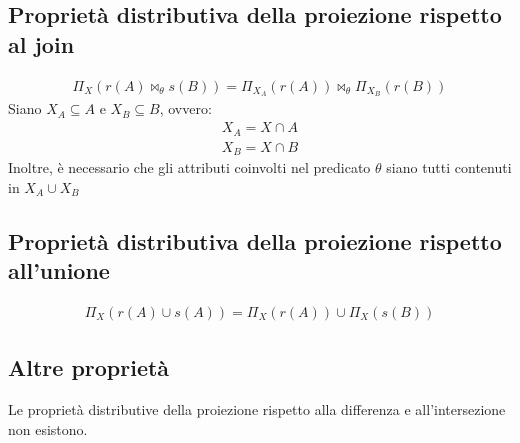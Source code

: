 \subsection{Proprietà distributiva della proiezione rispetto al join}
    \begin{equation}\begin{aligned}
        \Pi_X (r(A) \bowtie_{\theta} s(B)) = \Pi_{X_A} (r(A)) \bowtie_{\theta} \Pi_{X_B} (r(B))
    \end{aligned}\end{equation}
Siano $X_A \subseteq A$ e $X_B \subseteq B$, ovvero:
    \begin{equation}\begin{aligned}
        X_A = X \cap A\\
        X_B = X \cap B
    \end{aligned}\end{equation}
Inoltre, è necessario che gli attributi coinvolti nel predicato $\theta$ siano tutti contenuti in $X_A \cup X_B$

\subsection{Proprietà distributiva della proiezione rispetto all'unione}
    \begin{equation}\begin{aligned}
        \Pi_X (r(A) \cup s(A)) = \Pi_X (r(A)) \cup \Pi_X (s(B))
    \end{aligned}\end{equation}

\subsection{Altre proprietà}
Le proprietà distributive della proiezione rispetto alla differenza e all'intersezione non esistono.